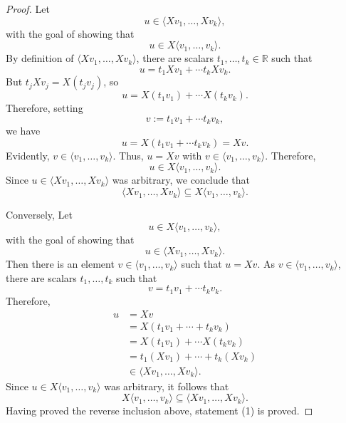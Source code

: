 \documentclass{amsart}
\newcommand{\RR}{\mathbb{R}}
\theoremstyle{definition}
\begin{document}
\begin{proof}
Let $$u\in\langle X v_1,\ldots,X v_k\rangle,$$ with the goal of showing that $$u\in X\langle v_1,\ldots,v_k\rangle.$$
By definition of $\langle X v_1,\ldots,X v_k\rangle$, there are scalars $t_1,\ldots,t_k\in\RR$ such that
$$
u=t_1X v_1 + \cdots t_k X v_k.
$$
But $t_jX v_j = X(t_jv_j)$, so 
\[
u = X (t_1v_1) + \cdots X (t_k v_k). 
\]
Therefore, setting $$v:=t_1v_1+\cdots t_kv_k,$$ we have
\[
u = X(t_1v_1+\cdots t_kv_k) = X v.
\]
Evidently, $v\in \langle v_1,\ldots,v_k\rangle$.
Thus, $u=X v$ with $v\in \langle v_1,\ldots,v_k\rangle$. Therefore, $$u\in X\langle v_1,\ldots,v_k\rangle.$$
Since $u\in \langle X v_1,\ldots,X v_k\rangle$ was arbitrary, we conclude that
$$\langle X v_1,\ldots,X v_k\rangle \subseteq X\langle v_1,\ldots,v_k\rangle.$$

Conversely, Let $$u\in X\langle v_1,\ldots, v_k\rangle,$$ with the goal of showing that $$u\in \langle X v_1,\ldots, X v_k\rangle.$$
Then there is an element $v\in \langle v_1,\ldots,v_k\rangle$ such that $u=X v$. As $v\in \langle v_1,\ldots,v_k\rangle$, there are scalars $t_1,\ldots,t_k$ such that $$v=t_1v_1+\cdots t_kv_k.$$
Therefore,
\begin{align*}
u &= X v\\
&= X (t_1v_1+\cdots + t_kv_k)\\
&= X (t_1v_1) + \cdots X (t_kv_k)\\
&= t_1(X v_1) + \cdots + t_k(X v_k)\\
&\in \langle X v_1,\ldots, X v_k\rangle.
\end{align*}
Since $u\in X\langle v_1,\ldots,v_k\rangle$ was arbitrary, it follows that $$
X\langle v_1,\ldots,v_k\rangle
\subseteq
\langle X v_1,\ldots,X v_k\rangle.
$$
Having proved the reverse inclusion above, statement (1) is proved. 

\end{proof}
\end{document}
